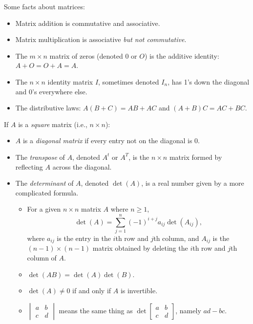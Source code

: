 \begin{facts}
	Some facts about matrices:
	\begin{itemize}
		\item Matrix addition is commutative and associative.
		\item Matrix multiplication is associative \emph{but not commutative}.
		\item The $m \times n$ matrix of zeros (denoted 0 or $O$) is the additive
			identity: $A + O = O + A = A$.
		\item The $n \times n$ identity matrix $I$, sometimes denoted $I_n$, has 1's
			down the diagonal and 0's everywhere else.
		\item The distributive laws: $A(B + C) = AB + AC$ and $(A + B)C = AC + BC$.
	\end{itemize}

	If $A$ is a \emph{square} matrix (i.e., $n \times n$):
	\begin{itemize}
		\item $A$ is a \emph{diagonal matrix} if every entry not on the diagonal is
			0.
		\item The \emph{transpose} of $A$, denoted $A^t$ or $A^T$, is the $n \times
			n$ matrix formed by reflecting $A$ across the diagonal.
		\item The \emph{determinant} of $A$, denoted $\det(A)$, is a real number
			given by a more complicated formula.
			\begin{itemize}
				\item For a given $n \times n$ matrix $A$ where $n \geq 1$,
					\[
						\det(A) = \sum_{j = 1}^n {(-1)}^{i + j} a_{ij} \det(A_{ij}),
					\]
					where $a_{ij}$ is the entry in the $i$th row and $j$th column, and
					$A_{ij}$ is the $(n - 1) \times (n -1)$ matrix obtained by deleting
					the $i$th row and $j$th column of $A$.
				\item $\det(AB) = \det(A) \det(B)$.
				\item $\det(A) \neq 0$ if and only if $A$ is invertible.
				\item $
					\begin{vmatrix}
						a & b \\
						c & d
					\end{vmatrix}$
					means the same thing as
					$\det
					\begin{bmatrix}
						a & b \\
						c & d
					\end{bmatrix}$,
					namely $ad - bc$.
			\end{itemize}
	\end{itemize}
\end{facts}

